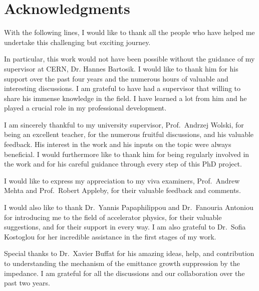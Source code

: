 \cleardoublepage
\chapter*{Acknowledgments}
\thispagestyle{simple} %



With the following lines, I would like to thank all the people who have helped me undertake this challenging but exciting journey.

In particular, this work would not have been possible without the guidance of my supervisor at CERN, Dr. Hannes Bartosik. I would like to thank him for his support over the past four years and the numerous hours of valuable and interesting discussions. I am grateful to have had a supervisor that willing to share his immense knowledge in the field. I have learned a lot from him and he played a crucial role in my professional development. 

I am sincerely thankful to my university supervisor, Prof.~Andrzej Wolski, for being an excellent teacher, for the numerous fruitful discussions, and his valuable feedback. His interest in the work and his inputs on the topic were always beneficial. I would furthermore like to thank him for being regularly involved in the work and for his careful guidance through every step of this PhD project. 

I would like to express my appreciation to my viva examiners, Prof.~Andrew Mehta and Prof.~Robert Appleby, for their valuable feedback and comments.

I would also like to thank Dr.~Yannis Papaphilippou and Dr.~Fanouria Antoniou for introducing me to the field of accelerator physics, for their valuable suggestions, and for their support in every way. I am also grateful to Dr.~Sofia Kostoglou for her incredible assistance in the first stages of my work.

Special thanks to Dr.~Xavier Buffat for his amazing ideas, help, and contribution to understanding the mechanism of the emittance growth suppression by the impedance. I am grateful for all the discussions and our collaboration over the past two years. 

